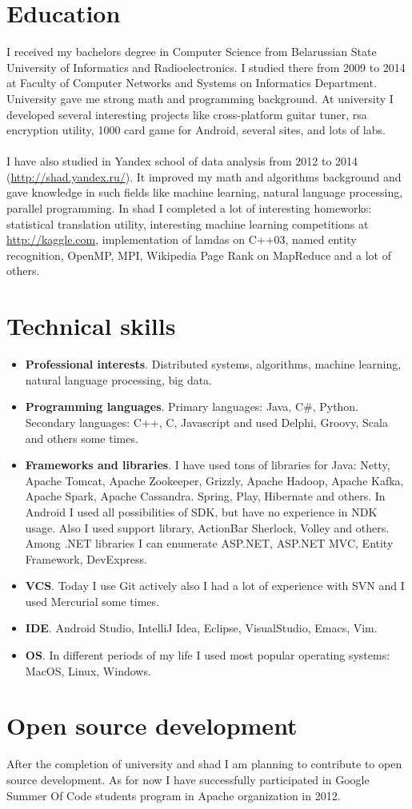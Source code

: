 \documentclass{article}
\begin{document}
\section*{Education}
I received my bachelors degree in Computer Science from Belarussian State University of Informatics and Radioelectronics. I studied there from 2009 to 2014 at Faculty of Computer Networks and Systems on Informatics Department. University gave me strong math and programming background. At university I developed several interesting projects like cross-platform guitar tuner, rsa encryption utility, 1000 card game for Android, several sites, and lots of labs.\\\\
I have also studied in Yandex school of data analysis from 2012 to 2014 (\url{http://shad.yandex.ru/}). It improved my math and algorithms background and gave knowledge in such fields like machine learning, natural language processing, parallel programming. In shad I completed a lot of interesting homeworks: statistical translation utility, interesting machine learning competitions at \url{http://kaggle.com}, implementation of lamdas on C++03, named entity recognition, OpenMP, MPI, Wikipedia Page Rank on MapReduce and a lot of others.

\section*{Technical skills}

\begin{itemize}
\item \textbf{Professional interests}. Distributed systems, algorithms, machine learning, natural language processing, big data.
\item \textbf{Programming languages}. Primary languages: Java, C\#, Python. Secondary languages: C++, C, Javascript and used Delphi, Groovy, Scala and others some times.
\item \textbf{Frameworks and libraries}. I have used tons of libraries for Java: Netty, Apache Tomcat, Apache Zookeeper, Grizzly, Apache Hadoop, Apache Kafka, Apache Spark, Apache Cassandra. Spring, Play, Hibernate and others. In Android I used all possibilities of SDK, but have no experience in NDK usage. Also I used support library, ActionBar Sherlock, Volley and others. Among .NET libraries I can enumerate ASP.NET, ASP.NET MVC, Entity Framework, DevExpress.
\item \textbf{VCS}. Today I use Git actively also I had a lot of experience with SVN and I used Mercurial some times.
\item \textbf{IDE}. Android Studio, IntelliJ Idea, Eclipse, VisualStudio, Emacs, Vim.
\item \textbf{OS}. In different periods of my life I used most popular operating systems: MacOS, Linux, Windows.
\end{itemize}

\section*{Open source development}
After the completion of university and shad I am planning to contribute to open source development. As for now I have successfully participated in Google Summer Of Code students program in Apache organization in 2012. 
\end{document}
